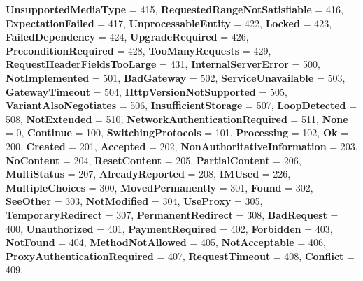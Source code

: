 \begin{DoxyCompactItemize}
{\bfseries Unsupported\+Media\+Type} = 415, 
{\bfseries Requested\+Range\+Not\+Satisfiable} = 416, 
{\bfseries Expectation\+Failed} = 417, 
\newline
{\bfseries Unprocessable\+Entity} = 422, 
{\bfseries Locked} = 423, 
{\bfseries Failed\+Dependency} = 424, 
{\bfseries Upgrade\+Required} = 426, 
\newline
{\bfseries Precondition\+Required} = 428, 
{\bfseries Too\+Many\+Requests} = 429, 
{\bfseries Request\+Header\+Fields\+Too\+Large} = 431, 
{\bfseries Internal\+Server\+Error} = 500, 
\newline
{\bfseries Not\+Implemented} = 501, 
{\bfseries Bad\+Gateway} = 502, 
{\bfseries Service\+Unavailable} = 503, 
{\bfseries Gateway\+Timeout} = 504, 
\newline
{\bfseries Http\+Version\+Not\+Supported} = 505, 
{\bfseries Variant\+Also\+Negotiates} = 506, 
{\bfseries Insufficient\+Storage} = 507, 
{\bfseries Loop\+Detected} = 508, 
\newline
{\bfseries Not\+Extended} = 510, 
{\bfseries Network\+Authentication\+Required} = 511, 
{\bfseries None} = 0, 
{\bfseries Continue} = 100, 
\newline
{\bfseries Switching\+Protocols} = 101, 
{\bfseries Processing} = 102, 
{\bfseries Ok} = 200, 
{\bfseries Created} = 201, 
\newline
{\bfseries Accepted} = 202, 
{\bfseries Non\+Authoritative\+Information} = 203, 
{\bfseries No\+Content} = 204, 
{\bfseries Reset\+Content} = 205, 
\newline
{\bfseries Partial\+Content} = 206, 
{\bfseries Multi\+Status} = 207, 
{\bfseries Already\+Reported} = 208, 
{\bfseries I\+M\+Used} = 226, 
\newline
{\bfseries Multiple\+Choices} = 300, 
{\bfseries Moved\+Permanently} = 301, 
{\bfseries Found} = 302, 
{\bfseries See\+Other} = 303, 
\newline
{\bfseries Not\+Modified} = 304, 
{\bfseries Use\+Proxy} = 305, 
{\bfseries Temporary\+Redirect} = 307, 
{\bfseries Permanent\+Redirect} = 308, 
\newline
{\bfseries Bad\+Request} = 400, 
{\bfseries Unauthorized} = 401, 
{\bfseries Payment\+Required} = 402, 
{\bfseries Forbidden} = 403, 
\newline
{\bfseries Not\+Found} = 404, 
{\bfseries Method\+Not\+Allowed} = 405, 
{\bfseries Not\+Acceptable} = 406, 
{\bfseries Proxy\+Authentication\+Required} = 407, 
\newline
{\bfseries Request\+Timeout} = 408, 
{\bfseries Conflict} = 409, 

\end{DoxyCompactItemize}

